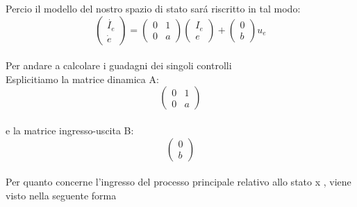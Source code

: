 \documentclass[a4paper,13pt]{article}
\begin{document}
Percio il modello del nostro spazio di stato sar\'a riscritto in tal modo:
\begin{equation*}	
\begin{pmatrix}
	
	\dot{I_{e}} \\ \dot{e}
	
\end{pmatrix} =         %
\begin{pmatrix}

	0&1\\0&a

\end{pmatrix}
\begin{pmatrix}

	I_{e}\\e

\end{pmatrix} +           %
\begin{pmatrix}

	0\\b

\end{pmatrix} u_e
\end{equation*} \\
Per andare a calcolare i guadagni dei singoli controlli\\

	Esplicitiamo la matrice dinamica A:        %
\begin{equation*}
\begin{pmatrix}

	0&1\\0&a

\end{pmatrix}
\end{equation*} \\

	e la matrice ingresso-uscita B:          %
\begin{equation*}
\begin{pmatrix}

	0\\b

\end{pmatrix}
\end{equation*} \\

Per quanto concerne l'ingresso del processo principale relativo allo stato x ,
viene visto nella seguente forma
\end{document}
